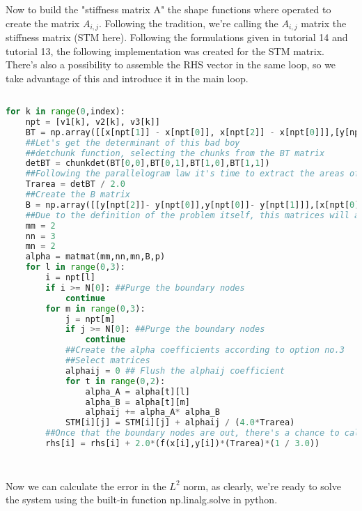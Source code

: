 \documentclass[a4paper, 11pt, oneside]{scrartcl}
\begin{document}
{\begin{center}
\begin{center}
\begin{lstlisting}[language=Python, caption={Pyhton, Information extraction },frame=single,breaklines=true]
\end{lstlisting}
\end{center}

Now to build the "stiffness matrix A" the shape functions where operated to create the matrix $A_{i,j}$. Following the tradition, we're calling the $A_{i,j}$  matrix the stiffness matrix (STM  here). Following the formulations given in tutorial 14 and tutorial 13, the following implementation was created for the STM matrix. There's also a possibility to assemble the RHS vector in the same loop, so we take advantage of this and introduce it in the main loop.
\hfill
\begin{lstlisting}[language=Python, caption={Pyhton, Stiffness matrix assembly },frame=single,breaklines=true]

for k in range(0,index):
    npt = [v1[k], v2[k], v3[k]]
    BT = np.array([[x[npt[1]] - x[npt[0]], x[npt[2]] - x[npt[0]]],[y[npt[1]] - y[npt[0]], y[npt[2]] - y[npt[0]]]])
    ##Let's get the determinant of this bad boy
    ##detchunk function, selecting the chunks from the BT matrix
    detBT = chunkdet(BT[0,0],BT[0,1],BT[1,0],BT[1,1])
    ##Following the parallelogram law it's time to extract the areas of the elements.
    Trarea = detBT / 2.0
    ##Create the B matrix
    B = np.array([[y[npt[2]]- y[npt[0]],y[npt[0]]- y[npt[1]]],[x[npt[0]]- x[npt[2]],x[npt[1]]- x[npt[0]]]])
    ##Due to the definition of the problem itself, this matrices will always be the same size, alpha and B and BT.
    mm = 2
    nn = 3
    mn = 2
    alpha = matmat(mm,nn,mn,B,p)
    for l in range(0,3):
        i = npt[l]
        if i >= N[0]: ##Purge the boundary nodes
            continue
        for m in range(0,3):
            j = npt[m]
            if j >= N[0]: ##Purge the boundary nodes
                continue
            ##Create the alpha coefficients according to option no.3
            ##Select matrices
            alphaij = 0 ## Flush the alphaij coefficient
            for t in range(0,2):
                alpha_A = alpha[t][l]
                alpha_B = alpha[t][m]
                alphaij += alpha_A* alpha_B
            STM[i][j] = STM[i][j] + alphaij / (4.0*Trarea)
        ##Once that the boundary nodes are out, there's a chance to calculate the right hand side integrals
        rhs[i] = rhs[i] + 2.0*(f(x[i],y[i])*(Trarea)*(1 / 3.0))
    
       
\end{lstlisting}
\end{center}

Now we can calculate the error in the $L^2$ norm, as clearly, we're ready to solve the system using the built-in function np.linalg.solve in python.
\begin{center}
\begin{lstlisting}[language=Python, caption={Pyhton, L2 error norm calculation },frame=single,breaklines=true]


\end{lstlisting}
\end{center}}
\end{document}
